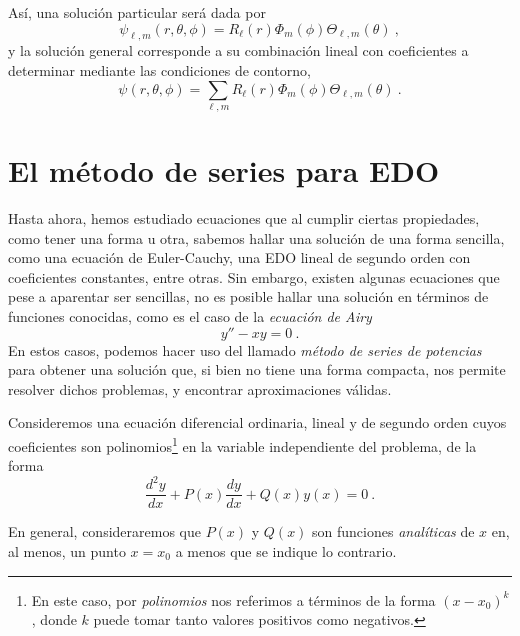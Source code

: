 Así, una solución particular será dada por
\begin{equation}
    \psi_{\ell, m}(r, \theta, \phi) = R_\ell(r) \Phi_m(\phi) \Theta_{\ell, m}(\theta) \ ,
\end{equation}
y la solución general corresponde a su combinación lineal con coeficientes a determinar mediante las condiciones de contorno,
\begin{equation}
    \psi(r, \theta, \phi) = \sum_{\ell, m} R_\ell(r) \Phi_m(\phi) \Theta_{\ell, m}(\theta) \ .
\end{equation}

\section{El método de series para EDO}

Hasta ahora, hemos estudiado ecuaciones que al cumplir ciertas propiedades, como tener una forma u otra, sabemos hallar una solución de una forma sencilla, como una ecuación de Euler-Cauchy, una EDO lineal de segundo orden con coeficientes constantes, entre otras. Sin embargo, existen algunas ecuaciones que pese a aparentar ser sencillas, no es posible hallar una solución en términos de funciones conocidas, como es el caso de la \emph{ecuación de Airy}
\begin{equation}
    y'' - xy = 0 \ .
\end{equation}
En estos casos, podemos hacer uso del llamado \emph{método de series de potencias} para obtener una solución que, si bien no tiene una forma compacta, nos permite resolver dichos problemas, y encontrar aproximaciones válidas.



Consideremos una ecuación diferencial ordinaria, lineal y de segundo orden cuyos coeficientes son polinomios\footnote{En este caso, por \emph{polinomios} nos referimos a términos de la forma $(x-x_0)^k$, donde $k$ puede tomar tanto valores positivos como negativos.} en la variable independiente del problema, de la forma
\begin{equation} \label{eq:EDO_Series}
    \frac{d^2 y}{dx} + P(x) \frac{dy}{dx} + Q(x) y(x) = 0 \ .
\end{equation}

En general, consideraremos que $P(x)$ y $Q(x)$ son funciones \emph{analíticas} de $x$ en, al menos, un punto $x=x_0$ a menos que se indique lo contrario.

